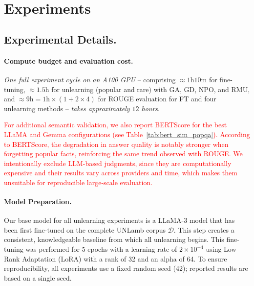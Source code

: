 \documentclass[sigconf,anonymous]{aamas}
\begin{document}
\section{Experiments}

\subsection{Experimental Details.}
\label{sec:experiments}

\paragraph{Compute budget and evaluation cost.}
\textit{One full experiment cycle on an A100 GPU} -- comprising $\approx1\text{h}10\text{m}$ for fine-tuning, $\approx1.5\text{h}$ for unlearning (popular and rare) with GA, GD, NPO, and RMU, and $\approx9\text{h}=1\text{h}\times\left(1+2\times4\right)$ for ROUGE evaluation for FT and four unlearning methods -- \textit{takes approximately $12$ hours}.

\textcolor{red}{
For additional semantic validation, we also report BERTScore for the best LLaMA and Gemma configurations (see Table~\ref{tab:bert_sim_popqa}). 
According to BERTScore, the degradation in answer quality is notably stronger when forgetting popular facts, reinforcing the same trend observed with ROUGE. 
We intentionally exclude LLM-based judgments, since they are computationally expensive and their results vary across providers and time, which makes them unsuitable for reproducible large-scale evaluation.
}



\paragraph{Model Preparation.}
Our base model for all unlearning experiments is a LLaMA-3 model that has been first fine-tuned on the complete UNLamb corpus $\mathcal{D}$. This step creates a consistent, knowledgeable baseline from which all unlearning begins. This fine-tuning was performed for 5 epochs with a learning rate of $2 \times 10^{-4}$ using Low-Rank Adaptation (LoRA) with a rank of 32 and an alpha of 64. 
To ensure reproducibility, all experiments use a fixed random seed (42); reported results are based on a single seed.
\end{document}
